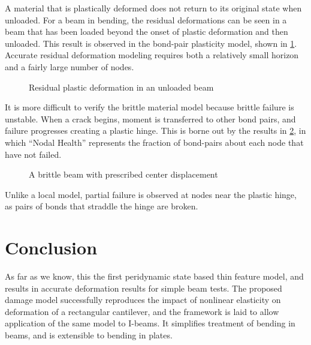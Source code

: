 \documentclass[11pt]{amsart}
\newcommand{\plotpath}{./plots}
\begin{document}
A material that is plastically deformed does not return to its original state when unloaded.
For a beam in bending, the residual deformations can be seen in a beam that has been loaded beyond the onset of plastic deformation and then unloaded.
This result is observed in the bond-pair plasticity model, shown in \cref{fig:ResidualPlasticity}. 
Accurate residual deformation modeling requires both a relatively small horizon and a fairly large number of nodes.


\begin{figure}[h]
  \scalebox{.45}{}
\endminipage\hfill
{}%
  \scalebox{.45}{}
\endminipage
\caption{Residual plastic deformation in an unloaded beam}
\label{fig:ResidualPlasticity}
\end{figure}

It is more difficult to verify the brittle material model because brittle failure is unstable.
When a crack begins, moment is transferred to other bond pairs, and failure progresses creating a plastic hinge.
This is borne out by the results in \cref{fig:brittleBeam}, in which ``Nodal Health'' represents the fraction of bond-pairs about each node that have not failed.

\begin{figure}[h]
  \centering
  \scalebox{.65}{}
  \caption{A brittle beam with prescribed center displacement}
  \label{fig:brittleBeam}
\end{figure}

Unlike a local model, partial failure is observed at nodes near the plastic hinge, as pairs of bonds that straddle the hinge are broken.

\section{Conclusion}

As far as we know, this the first peridynamic state based thin feature model, and results in accurate deformation results for simple beam tests.
The proposed damage model successfully reproduces the impact of nonlinear elasticity on deformation of a rectangular cantilever, and the framework is laid to allow application of the same model to I-beams.
It simplifies treatment of bending in beams, and is extensible to bending in plates.




\end{document}

